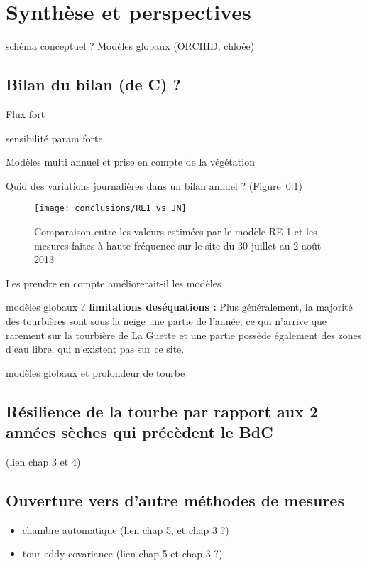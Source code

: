 \chapter*{Synthèse et perspectives}
\newpage

schéma conceptuel ? Modèles globaux (ORCHID, chloée)

\section{Bilan du bilan (de C) ?}

Flux fort

sensibilité param forte

Modèles multi annuel et prise en compte de la végétation

Quid des variations journalières dans un bilan annuel ? (Figure~\ref{fig:RE1_vs_JN})

\begin{figure}
\centering
\texttt{[image: conclusions/RE1\_vs\_JN]}
\caption{Comparaison entre les valeurs estimées par le modèle RE-1 et les mesures faites à haute fréquence sur le site du 30 juillet au 2 août 2013}
\label{fig:RE1_vs_JN}
\end{figure}


Les prendre en compte améliorerait-il les modèles

modèles globaux ?
\textbf{limitations deséquations :}
Plus généralement, la majorité des tourbières sont sous la neige une partie de l'année, ce qui n'arrive que rarement sur la tourbière de La Guette et une partie possède également des zones d'eau libre, qui n'existent pas sur ce site.

modèles globaux et profondeur de tourbe

\section{Résilience de la tourbe par rapport aux 2 années sèches qui précèdent le BdC}
(lien chap 3 et 4)

\section{Ouverture vers d'autre méthodes de mesures}
\begin{itemize}
\item chambre automatique (lien chap 5, et chap 3 ?)
\item tour eddy covariance (lien chap 5 et chap 3 ?)
\end{itemize}
